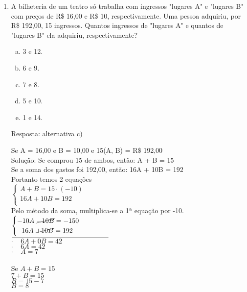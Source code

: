 \documentclass[a4paper,14pt]{article}
\begin{document}
\begin{multicols}{2}
\begin{enumerate}
        \item A bilheteria de um teatro só trabalha com ingressos "lugares A" e "lugares B" com preços de R\$ 16,00 e R\$ 10, respectivamente. Uma pessoa adquiriu, por R\$ 192,00, 15 ingressos. Quantos ingressos de "lugares A" e quantos de "lugares B" ela adquiriu, respectivamente?
        \begin{enumerate}[a)]
        	\item 3 e 12.
        	\item 6 e 9.
        	\item 7 e 8.
        	\item 5 e 10.
        	\item 1 e 14.
        \end{enumerate}
    
        Resposta: alternativa c)
        
        Se A = 16,00 e B = 10,00 e 15(A, B) = R\$ 192,00 \\
        Solução: Se comprou 15 de ambos, então: A + B = 15 \\
        Se a soma dos gastos foi 192,00, então: 16A + 10B = 192 \\
        Portanto temos 2 equações \\
        $\begin{cases}
        	A + B = 15 \cdot (-10) \\
        	16A + 10B = 192 \\
        \end{cases}$\\
        Pelo método da soma, multiplica-se a 1ª equação por -10. \\
        $\begin{cases}
        	-10A~\cancel{- 10B} = -150 \\
        	~~16A~\cancel{+ 10B} = 192 \\
        \end{cases}$ \\
        $
        \underline{\hspace{5cm}} \\
        $ \\
        $\cdot~~~~~6A + 0B = 42$ \\
        $\cdot~~~~~6A = 42$ \\
        $\cdot~~~~~A = 7$ \\
        \\
        Se $A + B = 15$\\
        $7 + B = 15$ \\
        $B = 15 - 7$ \\
        $B = 8$ \\
    

\end{enumerate}
\end{multicols}
\end{document}
